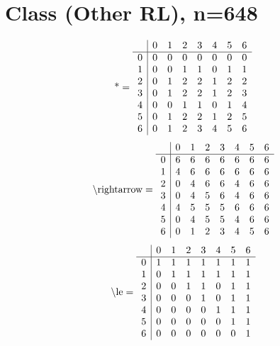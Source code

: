 \documentclass[11pt]{article}
\begin{document}
\section{Class (Other RL), n=648}
\[\text{*} = 
\begin{array}{r | r r r r r r r}
 & 0 & 1 & 2 & 3 & 4 & 5 & 6 \\ \hline
0 & 0 & 0 & 0 & 0 & 0 & 0 & 0 \\
1 & 0 & 0 & 1 & 1 & 0 & 1 & 1 \\
2 & 0 & 1 & 2 & 2 & 1 & 2 & 2 \\
3 & 0 & 1 & 2 & 2 & 1 & 2 & 3 \\
4 & 0 & 0 & 1 & 1 & 0 & 1 & 4 \\
5 & 0 & 1 & 2 & 2 & 1 & 2 & 5 \\
6 & 0 & 1 & 2 & 3 & 4 & 5 & 6 \\
\end{array}
\]
\[\text{\textbackslash rightarrow} = 
\begin{array}{r | r r r r r r r}
 & 0 & 1 & 2 & 3 & 4 & 5 & 6 \\ \hline
0 & 6 & 6 & 6 & 6 & 6 & 6 & 6 \\
1 & 4 & 6 & 6 & 6 & 6 & 6 & 6 \\
2 & 0 & 4 & 6 & 6 & 4 & 6 & 6 \\
3 & 0 & 4 & 5 & 6 & 4 & 6 & 6 \\
4 & 4 & 5 & 5 & 5 & 6 & 6 & 6 \\
5 & 0 & 4 & 5 & 5 & 4 & 6 & 6 \\
6 & 0 & 1 & 2 & 3 & 4 & 5 & 6 \\
\end{array}
\]
\[\text{\textbackslash le} = 
\begin{array}{r | r r r r r r r}
 & 0 & 1 & 2 & 3 & 4 & 5 & 6 \\ \hline
0 & 1 & 1 & 1 & 1 & 1 & 1 & 1 \\
1 & 0 & 1 & 1 & 1 & 1 & 1 & 1 \\
2 & 0 & 0 & 1 & 1 & 0 & 1 & 1 \\
3 & 0 & 0 & 0 & 1 & 0 & 1 & 1 \\
4 & 0 & 0 & 0 & 0 & 1 & 1 & 1 \\
5 & 0 & 0 & 0 & 0 & 0 & 1 & 1 \\
6 & 0 & 0 & 0 & 0 & 0 & 0 & 1 \\
\end{array}
\]
\end{document}
